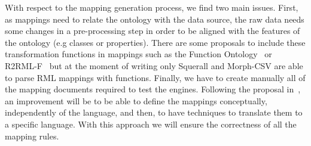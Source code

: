With respect to the mapping generation process, we find two main issues. First, as mappings need to relate the ontology with the data source, the raw data needs some changes in a pre-processing step in order to be aligned with the features of the ontology (e.g classes or properties). There are some proposals to include these transformation functions in mappings such as the Function Ontology~\citep{de2016ontology} or R2RML-F~\citep{debruyne2016r2rml} but at the moment of writing only Squerall and Morph-CSV are able to parse RML mappings with functions. Finally, we have to create manually all of the mapping documents required to test the engines. Following the proposal in~\citep{corcho2019towards}, an improvement will be to be able to define the mappings conceptually, independently of the language, and then, to have techniques to translate them to a specific language. With this approach we will ensure the correctness of all the mapping rules.

